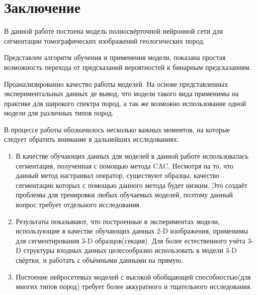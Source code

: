 \documentclass[14pt, a4paper, oneside, bold]{extarticle}
\begin{document}
\clearpage

\newpage


\section{Заключение}

В данной работе постоена модель полносвёрточной нейронной сети для сегментации томографических изображений геологических пород.

Представлен алгоритм обучения и применения модели, показана простая возможность перехода от предсказаний вероятностей к бинарным предсказаниям. 

Проанализированно качество работы моделей. На основе представленных  экспериментальных данных де вывод, что модели такого вида применимы на практике для широкого спектра пород, а так же возможно использование одной модели для различных типов пород.

В процессе работы обозначилось несколько важных моментов, на которые следует обратить внимание в дальнейших исследованиях:

\begin{enumerate}

	\item В качестве обучающих данных для моделей в данной работе использовалась сегментация, полученная с помощью метода CAC. Несмотря на то, что данный метод настраивал оператор, существуют образцы, качество сегментации которых с помощью данного метода будет  низким. Это создаёт проблемы для тренировки любых обучаемых моделей, поэтому данный вопрос требует отдельного исследования. 

	\item Результаты показывают, что построенные в экспериментах модели, использующие в качестве обучающих данных 2-D изображения, применимы для сегментирования 3-D образцов(секция). Для более естественного учёта 3-D структуры входных данных целесообразно использовать в модели 3-D свёртки, и работать с объёмными данными на прямую. 
	
	\item Постоение нейросетевых моделей с высокой обобщающей способностью(для многих типов пород) требует более аккуратного и тщательного исследования. 

\end{enumerate}

\newpage


\end{document}
